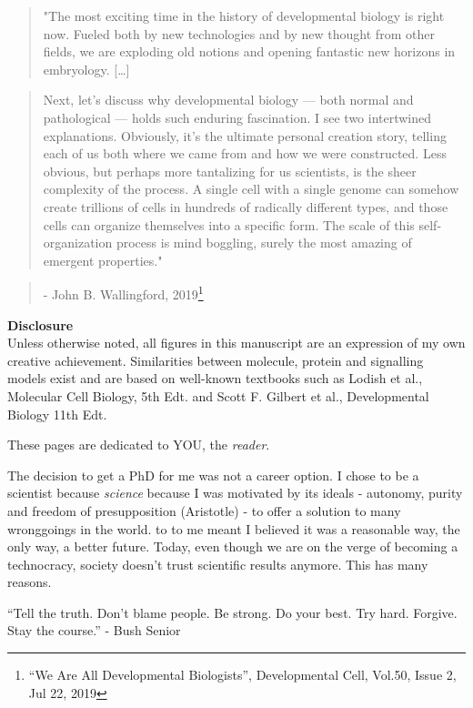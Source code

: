 \documentclass[11pt,singlespacinge,twoside]{reedthesis} %
\begin{document}
  \begin{preface}
    \begin{quote}
    "The most exciting time in the history of developmental biology is right now. Fueled both by new technologies and by new thought from other fields, we are exploding old notions and opening fantastic new horizons in embryology. {[}\ldots{}{]}
    \end{quote}
    \begin{quote}
    Next, let's discuss why developmental biology --- both normal and pathological --- holds such enduring fascination. I see two intertwined explanations. Obviously, it's the ultimate personal creation story, telling each of us both where we came from and how we were constructed. Less obvious, but perhaps more tantalizing for us scientists, is the sheer complexity of the process. A single cell with a single genome can somehow create trillions of cells in hundreds of radically different types, and those cells can organize themselves into a specific form. The scale of this self-organization process is mind boggling, surely the most amazing of emergent properties."
    \end{quote}
    \begin{quote}
    - John B. Wallingford, 2019\footnote{``We Are All Developmental Biologists'', Developmental Cell, Vol.50, Issue 2, Jul 22, 2019}
    \end{quote}
  \end{preface}
  \hypersetup{linkcolor=black}
  \setcounter{tocdepth}{2}
  \tableofcontents

  \listoftables

  \listoffigures
  \vfill
  \begin{center}
    \textbf{Disclosure}\\
    {Unless otherwise noted, all figures in this manuscript are an expression of my own creative achievement. Similarities between molecule, protein and signalling models exist and are based on well-known textbooks such as Lodish et al., Molecular Cell Biology, 5th Edt. and Scott F. Gilbert et al., Developmental Biology 11th Edt.}
  \end{center}
  \begin{dedication}
    These \pageref{LastPage} pages are dedicated to YOU, the \emph{reader}.\newline
    
    The decision to get a PhD for me was not a career option. I chose to be a scientist because \emph{science} because I was motivated by its ideals - autonomy, purity and freedom of presupposition (Aristotle) - to offer a solution to many wronggoings in the world. to to me meant I believed it was a reasonable way, the only way, a better future. Today, even though we are on the verge of becoming a technocracy, society doesn't trust scientific results anymore. This has many reasons.\newline
    
    ``Tell the truth. Don't blame people. Be strong. Do your best. Try hard. Forgive. Stay the course.'' - Bush Senior
  \end{dedication}
\mainmatter %
\pagestyle{fancyplain} %
\end{document}
